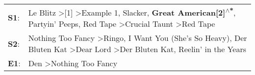 \begin{supertabular}{p{0.03\textwidth}p{0.92\textwidth}}
 \textbf{S1}:  &  Le Blitz\textsuperscript{} \textgreater {}[1]\textsuperscript{} \textgreater \enspace Example 1\textsuperscript{}, \enspace Slacker\textsuperscript{}, \enspace \textbf{Great American[2]\textsuperscript{$\wedge$*}}, \enspace Partyin' Peeps\textsuperscript{}, \enspace Red Tape\textsuperscript{} \textgreater \enspace Crucial Taunt\textsuperscript{} \textgreater \enspace Red Tape\textsuperscript{}  \enspace  \\
 \textbf{S2}:  &                                                                           Nothing Too Fancy\textsuperscript{} \textgreater \enspace Ringo\textsuperscript{}, \enspace I Want You (She's So Heavy)\textsuperscript{}, \enspace Der Bluten Kat\textsuperscript{} \textgreater \enspace Dear Lord\textsuperscript{} \textgreater \enspace Der Bluten Kat\textsuperscript{}, \enspace Reelin' in the Years\textsuperscript{}  \enspace  \\
 \textbf{E1}:  &                                                                                                                                                                                                                                                                                                                                          Den\textsuperscript{} \textgreater \enspace Nothing Too Fancy\textsuperscript{}  \enspace  \\
\end{supertabular}

